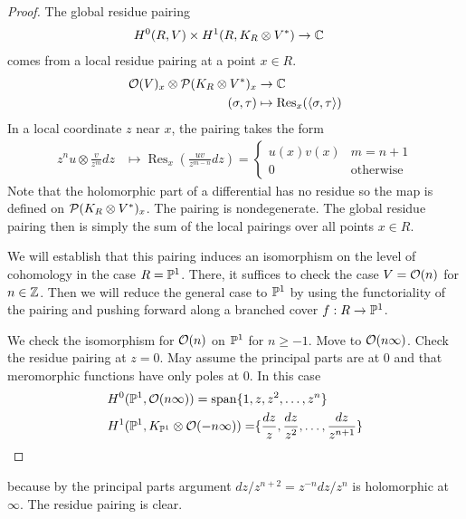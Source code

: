 \documentclass[12pt]{article}
\begin{document}
\begin{proof}
    The global residue pairing \begin{align*}
        H^0(R, V) \times H^1(R, K_R \otimes V^*) & \to \C 
    \end{align*} comes from a local residue pairing at a point $x\in R$. \begin{align*}
        \cO(V)_x \otimes \cP(K_R \otimes V^*)_x & \to \C \\
        (\sigma, \tau) & \mapsto \operatorname{Res}_x(\langle \sigma, \tau \rangle)
    \end{align*} In a local coordinate $z$ near $x$, the pairing takes the form \begin{align*}
        z^n u \otimes \frac{v}{z^m} dz & \mapsto \operatorname{Res}_x \left( \frac{u v}{z^{m-n}} dz \right) = \begin{cases}
            u(x)v(x) & m = n+1 \\
            0 & \text{otherwise}
        \end{cases}
    \end{align*}
    Note that the holomorphic part of a differential has no residue so the map is defined on $\cP(K_R \otimes V^*)_x$. The pairing is nondegenerate. The global residue pairing then is simply the sum of the local pairings over all points $x \in R$.

    We will establish that this pairing induces an isomorphism on the level of cohomology in the case $R = \P^1$. There, it suffices to check the case $V = \cO(n)$ for $n \in \Z$. Then we will reduce the general case to $\P^1$ by using the functoriality of the pairing and pushing forward along a branched cover $f: R \to \P^1$.

    We check the isomorphism for $\cO(n)$ on $\P^1$ for $n \geq -1$. Move to $\cO(n\infty)$. Check the residue pairing at $z=0$. May assume the principal parts are at $0$ and that meromorphic functions have only poles at $0$. In this case \begin{align*}
        H^0(\P^1, \cO(n\infty)) & = \operatorname{span}\set{1, z, z^2, \ldots, z^n} \\
        H^1(\P^1, K_{\P^1} \otimes \cO(-n\infty)) = \span\set{\frac{dz}{z},
        \frac{dz}{z^2}, \ldots, \frac{dz}{z^{n+1}}} 
    \end{align*}
\end{proof} because by the principal parts argument $dz/z^{n+2} = z^{-n} dz/z^n$ is holomorphic at $\infty$. The residue pairing is clear.
\end{document}
